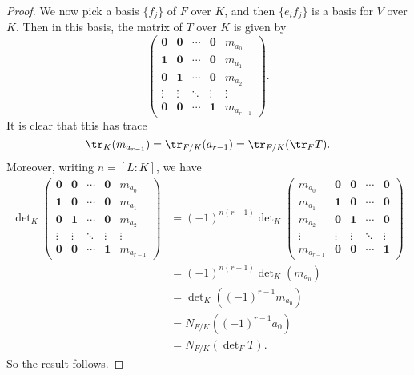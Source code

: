 \documentclass[a4paper]{article}
\begin{document}
\begin{proof}
  We now pick a basis $\{f_j\}$ of $F$ over $K$, and then $\{e_i f_j\}$ is a basis for $V$ over $K$. Then in this basis, the matrix of $T$ over $K$ is given by
  \[
    \begin{pmatrix}
      \mathbf{0} & \mathbf{0} & \cdots & \mathbf{0} & m_{a_0}\\
      \mathbf{1} & \mathbf{0} & \cdots & \mathbf{0} & m_{a_1}\\
      \mathbf{0} & \mathbf{1} & \cdots & \mathbf{0} & m_{a_2}\\
      \vdots & \vdots & \ddots & \vdots & \vdots\\
      \mathbf{0} & \mathbf{0} & \cdots & \mathbf{1} & m_{a_{r - 1}}
    \end{pmatrix}.
  \]
  It is clear that this has trace
  \[
    \tr_K (m_{a_{r - 1}}) = \tr_{F/K} (a_{r - 1}) = \tr_{F/K} (\tr_F T).
  \]
  Moreover, writing $n = [L:K]$, we have
  \begin{align*}
    \det\nolimits_K
     \begin{pmatrix}
      \mathbf{0} & \mathbf{0} & \cdots & \mathbf{0} & m_{a_0}\\
      \mathbf{1} & \mathbf{0} & \cdots & \mathbf{0} & m_{a_1}\\
      \mathbf{0} & \mathbf{1} & \cdots & \mathbf{0} & m_{a_2}\\
      \vdots & \vdots & \ddots & \vdots & \vdots\\
      \mathbf{0} & \mathbf{0} & \cdots & \mathbf{1} & m_{a_{r - 1}}
    \end{pmatrix}
    &= (-1)^{n(r - 1)}
    \det\nolimits_K
    \begin{pmatrix}
      m_{a_0} & \mathbf{0} & \mathbf{0} & \cdots & \mathbf{0}\\
      m_{a_1} &\mathbf{1} & \mathbf{0} & \cdots & \mathbf{0}\\
      m_{a_2} &\mathbf{0} & \mathbf{1} & \cdots & \mathbf{0}\\
      \vdots & \vdots & \vdots & \ddots & \vdots\\
      m_{a_{r - 1}} & \mathbf{0} & \mathbf{0} & \cdots & \mathbf{1}
    \end{pmatrix}\\
    &= (-1)^{n(r - 1)} \det\nolimits_K(m_{a_0})\\
    &= \det\nolimits_K ((-1)^{r - 1} m_{a_0})\\
    &= N_{F/K}((-1)^{r - 1} a_0)\\
    &= N_{F/K} (\det\nolimits_F T).
  \end{align*}
  So the result follows.
\end{proof}
\end{document}
